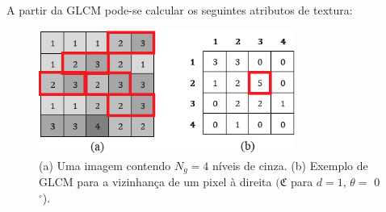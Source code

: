 \documentclass[a4paper]{ifacconf}
\begin{document}


A partir da GLCM pode-se calcular os seguintes atributos de textura: 

\begin{figure}[hbt!]
\begin{center}
\includegraphics[width=8.4cm]{imgs/Fig03.png}    %
\caption{(a) Uma imagem contendo $N_g = 4$ níveis de cinza. (b) Exemplo de GLCM para a vizinhança de um pixel à direita $(\mathfrak{C}$ para $d = 1$, $\theta =$ 0$^{\circ}$).} 
\label{fig:Fig03}
\end{center}
\end{figure}
\end{document}
